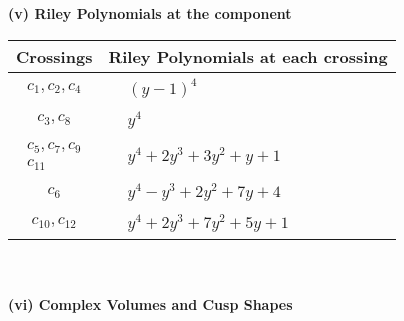 \documentclass[1p]{elsarticle_modified}
\theoremstyle{definition}
\begin{document}
\newpage\renewcommand{\arraystretch}{1}
\flushleft \textbf{(v) Riley Polynomials at the component}\newline \\
\begin{tabular}{m{50pt}|m{274pt}}
Crossings & \hspace{64pt}Riley Polynomials at each crossing \\
\hline $$\begin{aligned}c_{1},c_{2},c_{4}\end{aligned}$$&$\begin{aligned}
&(y-1)^4
\end{aligned}$\\
\hline $$\begin{aligned}c_{3},c_{8}\end{aligned}$$&$\begin{aligned}
&y^4
\end{aligned}$\\
\hline $$\begin{aligned}c_{5},c_{7},c_{9}\\c_{11}\end{aligned}$$&$\begin{aligned}
&y^4+2 y^3+3 y^2+y+1
\end{aligned}$\\
\hline $$\begin{aligned}c_{6}\end{aligned}$$&$\begin{aligned}
&y^4- y^3+2 y^2+7 y+4
\end{aligned}$\\
\hline $$\begin{aligned}c_{10},c_{12}\end{aligned}$$&$\begin{aligned}
&y^4+2 y^3+7 y^2+5 y+1
\end{aligned}$\\
\hline
\end{tabular}\\~\\
\newpage\flushleft \textbf{(vi) Complex Volumes and Cusp Shapes}
\end{document}
